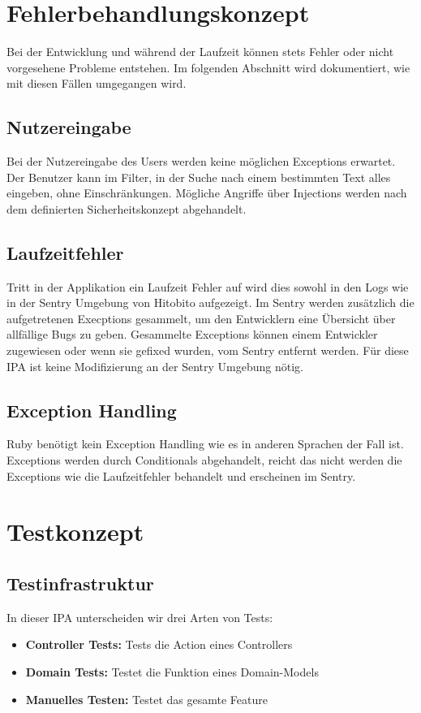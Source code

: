 \section{Fehlerbehandlungskonzept}
Bei der Entwicklung und während der Laufzeit können stets Fehler oder nicht vorgesehene Probleme entstehen.
Im folgenden Abschnitt wird dokumentiert, wie mit diesen Fällen umgegangen wird.

\subsection{Nutzereingabe}
Bei der Nutzereingabe des Users werden keine möglichen Exceptions erwartet. Der Benutzer kann im Filter, in der Suche nach einem
bestimmten Text alles eingeben, ohne Einschränkungen. Mögliche Angriffe über Injections werden nach dem definierten
Sicherheitskonzept abgehandelt.

\subsection{Laufzeitfehler}
Tritt in der Applikation ein Laufzeit Fehler auf wird dies sowohl in den Logs wie in der Sentry
Umgebung von Hitobito aufgezeigt. Im Sentry werden zusätzlich die aufgetretenen Execptions gesammelt, um 
den Entwicklern eine Übersicht über allfällige Bugs zu geben. Gesammelte Exceptions können einem Entwickler
zugewiesen oder wenn sie gefixed wurden, vom Sentry entfernt werden. Für diese IPA ist keine Modifizierung an der 
Sentry Umgebung nötig.

\subsection{Exception Handling}
Ruby benötigt kein Exception Handling wie es in anderen Sprachen der Fall ist. Exceptions werden durch Conditionals
abgehandelt, reicht das nicht werden die Exceptions wie die Laufzeitfehler behandelt und erscheinen im Sentry.

\section{Testkonzept}
\subsection{Testinfrastruktur}
In dieser IPA unterscheiden wir drei Arten von Tests:

\begin{itemize}
   \item \textbf{Controller Tests:} Tests die Action eines Controllers
   \item \textbf{Domain Tests:} Testet die Funktion eines Domain-Models
   \item \textbf{Manuelles Testen:} Testet das gesamte Feature
\end{itemize}

